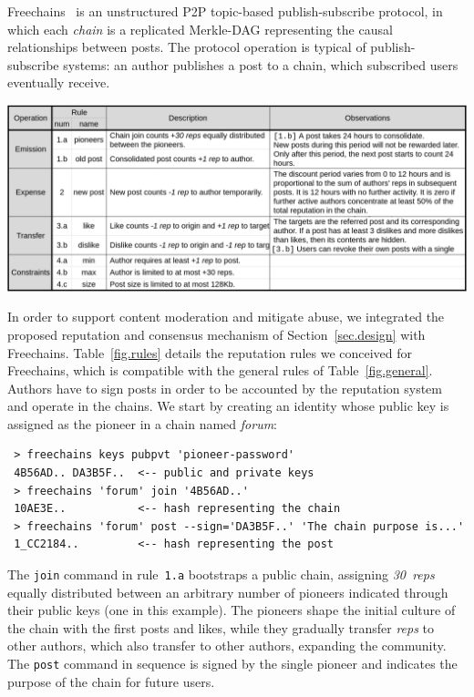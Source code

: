 \documentclass[12pt]{article}
\newcommand{\FC}       {Freechains\xspace}
\newcommand{\reps}     {\emph{reps}\xspace}
\newcommand{\nreps}[1] {\emph{#1~reps\xspace}}
\newcommand{\code}[1]  {\texttt{\footnotesize{#1}}}
\begin{document}
\FC~\cite{fcs.sbseg20} is an unstructured P2P topic-based publish-subscribe
protocol, in which each \emph{chain} is a replicated Merkle-DAG representing
the causal relationships between posts.
%
The protocol operation is typical of publish-subscribe systems: an author
publishes a post to a chain, which subscribed users eventually receive.

\begin{table}
\centering
\includegraphics[width=\textwidth]{rules.png}
\caption{
    Reputation rules for public forum chains in \FC.
    The chosen constants ($30~reps$, $24h$, etc) are arbitrary and target
    typical Internet forums.
}
\label{fig.rules}
\end{table}

In order to support content moderation and mitigate abuse, we integrated the
proposed reputation and consensus mechanism of Section~\ref{sec.design} with
\FC.
Table~\ref{fig.rules} details the reputation rules we conceived for
\FC, which is compatible with the general rules of Table~\ref{fig.general}.
Authors have to sign posts in order to be accounted by the reputation system
and operate in the chains.
We start by creating an identity whose public key is assigned as the pioneer in
a chain named \emph{forum}:

{\footnotesize
\begin{verbatim}
 > freechains keys pubpvt 'pioneer-password'
 4B56AD.. DA3B5F..  <-- public and private keys
 > freechains 'forum' join '4B56AD..'
 10AE3E..           <-- hash representing the chain
 > freechains 'forum' post --sign='DA3B5F..' 'The chain purpose is...'
 1_CC2184..         <-- hash representing the post
\end{verbatim}
}

The \code{join} command in rule~\code{1.a} bootstraps a public chain,
assigning \nreps{30} equally distributed between an arbitrary number of
pioneers indicated through their public keys (one in this example).
The pioneers shape the initial culture of the chain with the first posts and
likes, while they gradually transfer \reps to other authors, which also
transfer to other authors, expanding the community.
%
The \code{post} command in sequence is signed by the single pioneer and
indicates the purpose of the chain for future users.
\end{document}
